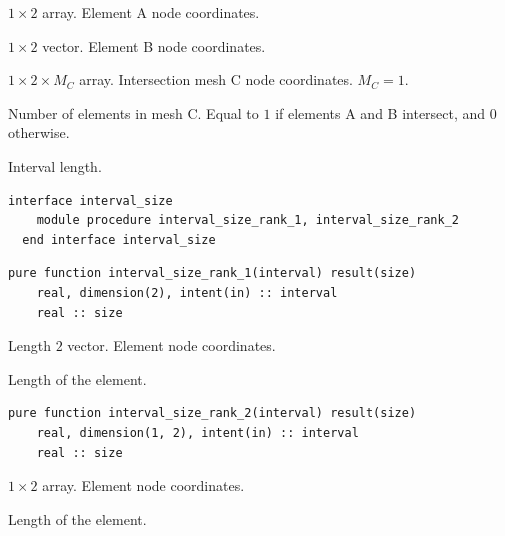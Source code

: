\documentclass{article}
\begin{document}
\begin{description}[font=\ttfamily\bfseries,leftmargin=2.2\parindent,labelindent=1.7\parindent,noitemsep]
  \item[interval\_a] $1 \times 2$ array. Element A node coordinates.
  \item[interval\_b] $1 \times 2$ vector. Element B node coordinates.
  \item[interval\_c] $1 \times 2 \times M_C$ array. Intersection mesh C node
    coordinates. $M_C = 1$.
  \item[n\_intervals\_c] Number of elements in mesh C. Equal to $1$ if elements
    A and B intersect, and $0$ otherwise.
\end{description}

\noindent Interval length.
  
\begin{lstlisting}[language=FORTRAN]  
  interface interval_size
    module procedure interval_size_rank_1, interval_size_rank_2
  end interface interval_size
\end{lstlisting} 
  
\begin{lstlisting}[language=FORTRAN]  
  pure function interval_size_rank_1(interval) result(size)
    real, dimension(2), intent(in) :: interval
    real :: size
\end{lstlisting} 

\begin{description}[font=\ttfamily\bfseries,leftmargin=2.2\parindent,labelindent=1.7\parindent,noitemsep]
  \item[interval] Length $2$ vector. Element node coordinates.
  \item[size] Length of the element.
\end{description}
  
\begin{lstlisting}[language=FORTRAN]    
  pure function interval_size_rank_2(interval) result(size)
    real, dimension(1, 2), intent(in) :: interval
    real :: size
\end{lstlisting} 

\begin{description}[font=\ttfamily\bfseries,leftmargin=2.2\parindent,labelindent=1.7\parindent,noitemsep]
  \item[interval] $1 \times 2$ array. Element node coordinates.
  \item[size] Length of the element.
\end{description}
\end{document}
